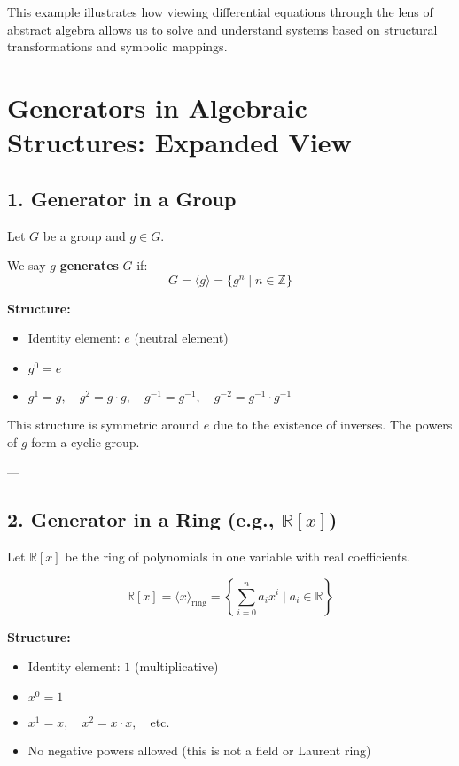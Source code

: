 \documentclass[12pt]{article}
\begin{document}
	This example illustrates how viewing differential equations through the lens of abstract algebra allows us to solve and understand systems based on structural transformations and symbolic mappings.
	
\section*{Generators in Algebraic Structures: Expanded View}

\subsection*{1. Generator in a Group}

Let $G$ be a group and $g \in G$.

We say $g$ \textbf{generates} $G$ if:
\[
G = \langle g \rangle = \{g^n \mid n \in \mathbb{Z} \}
\]

\textbf{Structure:}
\begin{itemize}
	\item Identity element: $e$ (neutral element)
	\item $g^0 = e$
	\item $g^1 = g,\quad g^2 = g \cdot g, \quad g^{-1} = g^{-1}, \quad g^{-2} = g^{-1} \cdot g^{-1}$
\end{itemize}

This structure is symmetric around $e$ due to the existence of inverses. The powers of $g$ form a cyclic group.

---

\subsection*{2. Generator in a Ring (e.g., $\mathbb{R}[x]$)}

Let $\mathbb{R}[x]$ be the ring of polynomials in one variable with real coefficients.

\[
\mathbb{R}[x] = \langle x \rangle_{\text{ring}} = \left\{ \sum_{i=0}^n a_i x^i \mid a_i \in \mathbb{R} \right\}
\]

\textbf{Structure:}
\begin{itemize}
	\item Identity element: $1$ (multiplicative)
	\item $x^0 = 1$
	\item $x^1 = x,\quad x^2 = x \cdot x, \quad \text{etc.}$
	\item No negative powers allowed (this is not a field or Laurent ring)
\end{itemize}
\end{document}
